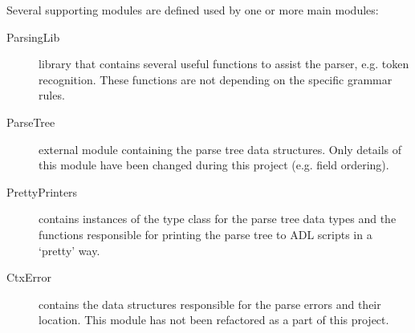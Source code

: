   \noindent
  Several supporting modules are defined used by one or more main modules:
  \begin{description}
    \item[ParsingLib] library that contains several useful functions to assist the parser, e.g. token recognition.
      These functions are not depending on the specific grammar rules.
      
    \item[ParseTree] external module containing the parse tree data structures.
      Only details of this module have been changed during this project (e.g. field ordering).
    
    \item[PrettyPrinters] contains instances of the  type class for the parse tree data types and the functions responsible for printing the parse tree to ADL scripts in a `pretty' way.

    \item[CtxError] contains the data structures responsible for the parse errors and their location.
      This module has not been refactored as a part of this project.
    
  \end{description}
